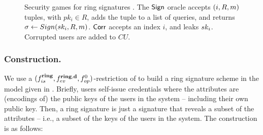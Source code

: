 \begin{figure}[ht!]
  \centering
  \caption{Security games for ring signatures \cite{bkm06}. The $\mathsf{Sign}$
    oracle accepts $(i,R,m)$ tuples, with $pk_i \in R$, adds the tuple to a
    list of queries, and returns $\sigma \gets Sign(sk_i,R,m)$.
    $\mathsf{Corr}$ accepts an index $i$, and leaks $sk_i$. Corrupted users are
    added to $CU$.}
  \label{fig:model-rs}  
\end{figure}


\subsubsection{\CUASRing Construction.} %
We use a $(f_{is}^{\mathbf{ring}},f_{ev}^{\mathbf{ring},\mathbf{d}},f_{op}^0)$-restriction
of \CUASGenHideIss to build a ring signature scheme in the model given in
. Briefly, users self-issue credentials where the
attributes are (encodings of) the public keys of the users in the system --
including their own public key. Then, a ring signature is just a
\CUASGenHideIss signature that reveals a subset of the attributes -- i.e., a
subset of the keys of the users in the system. The construction
is as follows:

